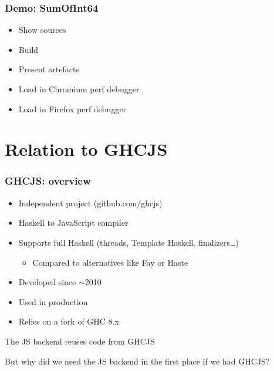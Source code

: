 \documentclass{beamer}
\begin{document}
\begin{frame}
\frametitle{Demo: SumOfInt64}
\begin{itemize}
\item Show sources
\item Build
\item Present artefacts
\item Load in Chromium perf debugger
\item Load in Firefox perf debugger
\end{itemize}
\end{frame}

\section{Relation to GHCJS}

\begin{frame}
\frametitle{GHCJS: overview}
\begin{itemize}
\item Independent project (github.com/ghcjs)
\item Haskell to JavaScript compiler
\item Supports full Haskell (threads, Template Haskell, finalizers…)
\begin{itemize}
\item Compared to alternatives like Fay or Haste
\end{itemize}
\item Developed since $\sim$2010
\item Used in production
\item Relies on a fork of GHC 8.x
\end{itemize}
\begin{center}
\alert{The JS backend reuses code from GHCJS}
\end{center}
But why did we need the JS backend in the first place if we had GHCJS?
\end{frame}
\end{document}
